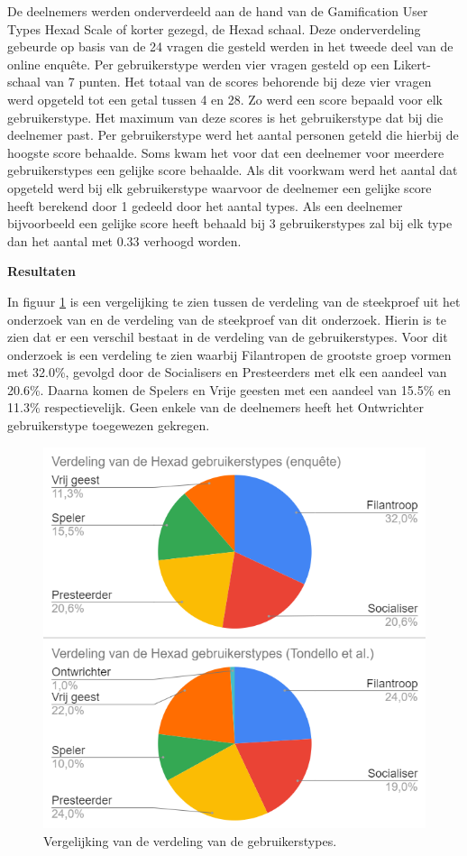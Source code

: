 De deelnemers werden onderverdeeld aan de hand van de Gamification User Types Hexad Scale of korter gezegd, de Hexad schaal. Deze onderverdeling gebeurde op basis van de 24 vragen die gesteld werden in het tweede deel van de online enquête. Per gebruikerstype werden vier vragen gesteld op een Likert-schaal van 7 punten. Het totaal van de scores behorende bij deze vier vragen werd opgeteld tot een getal tussen 4 en 28. Zo werd een score bepaald voor elk gebruikerstype. Het maximum van deze scores is het gebruikerstype dat bij die deelnemer past. Per gebruikerstype werd het aantal personen geteld die hierbij de hoogste score behaalde. Soms kwam het voor dat een deelnemer voor meerdere gebruikerstypes een gelijke score behaalde. Als dit voorkwam werd het aantal dat opgeteld werd bij elk gebruikerstype waarvoor de deelnemer een gelijke score heeft berekend door 1 gedeeld door het aantal types. Als een deelnemer bijvoorbeeld een gelijke score heeft behaald bij 3 gebruikerstypes zal bij elk type dan het aantal met 0.33 verhoogd worden.

\textbf{Resultaten}

In figuur \ref{fig:vergelijkingonderzoek} is een vergelijking te zien tussen de verdeling van de steekproef uit het onderzoek van \textcite{Tondello2016} en de verdeling van de steekproef van dit onderzoek. Hierin is te zien dat er een verschil bestaat in de verdeling van de gebruikerstypes. Voor dit onderzoek is een verdeling te zien waarbij Filantropen de grootste groep vormen met 32.0\%, gevolgd door de Socialisers en Presteerders met elk een aandeel van 20.6\%. Daarna komen de Spelers en Vrije geesten met een aandeel van 15.5\% en 11.3\% respectievelijk. Geen enkele van de deelnemers heeft het Ontwrichter gebruikerstype toegewezen gekregen.

\begin{figure}
    \includegraphics[width=\linewidth]{VergelijkingOnderzoek.png}
    \caption{Vergelijking van de verdeling van de gebruikerstypes.}
    \label{fig:vergelijkingonderzoek}
\end{figure}

